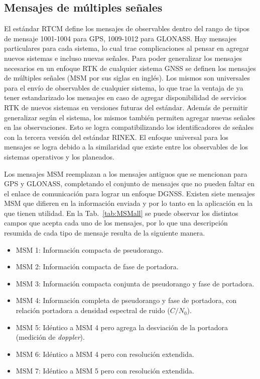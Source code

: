 \documentclass[a4paper,12pt,oneside,onecolumn,final,openright]{book}%
\begin{document}
\subsection{Mensajes de múltiples señales}
	El estándar RTCM define los mensajes de observables dentro del rango de tipos de mensaje 1001-1004 para GPS, 1009-1012 para GLONASS. Hay mensajes particulares para cada sistema, lo cual trae complicaciones al pensar en agregar nuevos sistemas e incluso nuevas señales. Para poder generalizar los mensajes necesarios en un enfoque RTK de cualquier sistema GNSS se definen los mensajes de múltiples señales (MSM por sus siglas en inglés). Los mismos son universales para el envío de observables de cualquier sistema, lo que trae la ventaja de ya tener estandarizado los mensajes en caso de agregar disponibilidad de servicios RTK de nuevos sistemas en versiones futuras del estándar. Además de permitir generalizar según el sistema, los mismos también permiten agregar nuevas señales en las observaciones. Esto se logra compatibilizando los identificadores de señales con la tercera versión del estándar RINEX. El enfoque universal para los mensajes se logra debido a la similaridad que existe entre los observables de los sistemas operativos y los planeados.
	
	Los mensajes MSM reemplazan a los mensajes antiguos que se mencionan para GPS y GLONASS, completando el conjunto de mensajes que no pueden faltar en el enlace de comunicación para lograr un enfoque DGNSS. Existen siete mensajes MSM que difieren en la información enviada y por lo tanto en la aplicación en la que tienen utilidad. En la Tab.~\ref{tab:MSMall} se puede observar los distintos campos que acepta cada uno de los mensajes, por lo que una descripción resumida de cada tipo de mensaje resulta de la siguiente manera.
\begin{itemize}
	\item MSM 1: Información compacta de pseudorango.
	\item MSM 2: Información compacta de fase de portadora.
	\item MSM 3: Información compacta conjunta de pseudorango y fase de portadora.
	\item MSM 4: Información completa de pseudorango y fase de portadora, con relación portadora a densidad espectral de ruido ($C/N_0$).
	\item MSM 5: Idéntico a MSM 4 pero agrega la desviación de la portadora (medición de \textit{doppler}).
	\item MSM 6: Idéntico a MSM 4 pero con resolución extendida.
	\item MSM 7: Idéntico a MSM 5 pero con resolución extendida.
\end{itemize}
\end{document}
